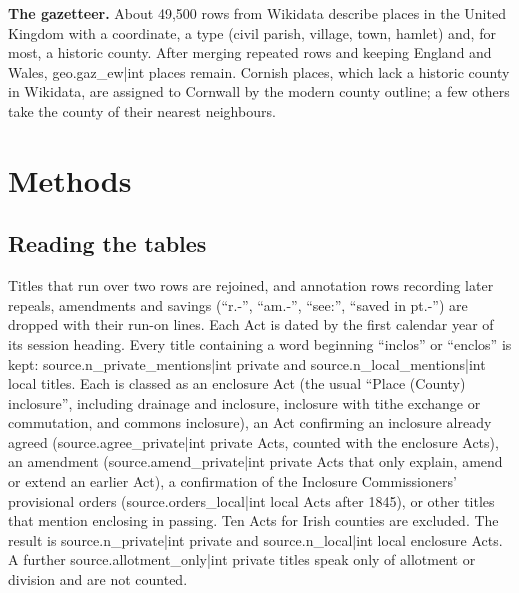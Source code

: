 \documentclass[11pt,a4paper]{article}
\begin{document}
\textbf{The gazetteer.} About 49,500 rows from Wikidata describe places in the United Kingdom with a coordinate, a type (civil parish, village, town, hamlet) and, for most, a historic county. After merging repeated rows and keeping England and Wales, {{geo.gaz_ew|int}} places remain. Cornish places, which lack a historic county in Wikidata, are assigned to Cornwall by the modern county outline; a few others take the county of their nearest neighbours.

\section{Methods}
\subsection{Reading the tables}
Titles that run over two rows are rejoined, and annotation rows recording later repeals, amendments and savings (``r.-'', ``am.-'', ``see:'', ``saved in pt.-'') are dropped with their run-on lines. Each Act is dated by the first calendar year of its session heading. Every title containing a word beginning ``inclos'' or ``enclos'' is kept: {{source.n_private_mentions|int}} private and {{source.n_local_mentions|int}} local titles. Each is classed as an enclosure Act (the usual ``Place (County) inclosure'', including drainage and inclosure, inclosure with tithe exchange or commutation, and commons inclosure), an Act confirming an inclosure already agreed ({{source.agree_private|int}} private Acts, counted with the enclosure Acts), an amendment ({{source.amend_private|int}} private Acts that only explain, amend or extend an earlier Act), a confirmation of the Inclosure Commissioners' provisional orders ({{source.orders_local|int}} local Acts after 1845), or other titles that mention enclosing in passing. Ten Acts for Irish counties are excluded. The result is {{source.n_private|int}} private and {{source.n_local|int}} local enclosure Acts. A further {{source.allotment_only|int}} private titles speak only of allotment or division and are not counted.
\end{document}
